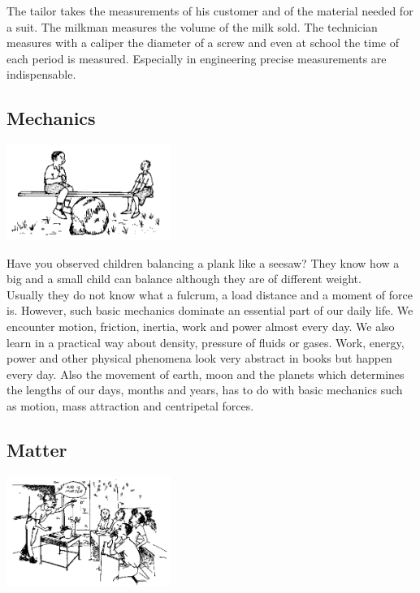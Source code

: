 \begin{multicols}{2}
The tailor takes the measurements of his customer and of the material needed for a suit. The
milkman measures the volume of the milk sold. The technician measures with a caliper the
diameter of a screw and even at school the time of each period is measured. Especially in
engineering precise measurements are indispensable.

\vfill
\columnbreak

\subsection{Mechanics}

\begin{center}
\includegraphics[width=0.4\textwidth]{./img/source/mechanics.png}
\end{center}

Have you observed children balancing a plank like a seesaw? They know how a big and a
small child can balance although they are of different weight.\\

Usually they do not know what a fulcrum, a load distance and a moment of force is. However,
such basic mechanics dominate an essential part of our daily life. We encounter motion,
friction, inertia, work and power almost every day. We also learn in a practical way about
density, pressure of fluids or gases. Work, energy, power and other physical phenomena look
very abstract in books but happen every day. Also the movement of earth, moon and the
planets which determines the lengths of our days, months and years, has to do with basic
mechanics such as motion, mass attraction and centripetal forces.

\subsection{Matter}

\begin{center}
\includegraphics[width=0.4\textwidth]{./img/source/matter.png}
\end{center}


\end{multicols}
